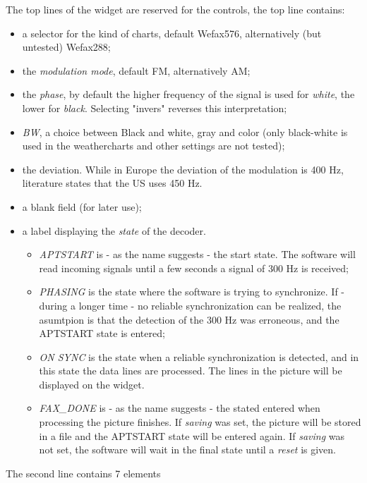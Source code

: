 \documentclass[11pt]{article}
\begin{document}
The top lines of the widget are reserved for the controls,
the top line contains:
\begin{itemize}
\item a selector for the kind of charts, default Wefax576, alternatively
(but untested) Wefax288;
\item the {\em modulation mode}, default FM, alternatively AM;
\item the {\em phase}, by default the higher frequency of the signal
is used for {\em white}, the lower for {\em black}.
Selecting "invers" reverses this interpretation;
\item {\em BW}, a choice between Black and white, gray and color
(only black-white is used in the weathercharts and other settings are not
tested);
\item the {deviation}. While in Europe the deviation of the modulation is
400 Hz, literature states that the US uses 450 Hz.
\item a blank field (for later use);
\item a label displaying the {\em state} of the decoder. 
\begin{itemize}
\item {\em APTSTART} is - as the name suggests - the start state. The software
will read incoming signals until a few seconds a signal of 300 Hz
is received;
\item {\em PHASING} is the state where the software is trying to synchronize.
If - during a longer time - no reliable synchronization can be realized, the
asumtpion is that the detection of the 300 Hz was erroneous, and the APTSTART
state is entered;
\item {\em ON SYNC} is the state when a reliable synchronization is detected,
and in this state the data lines are processed.
The lines in the picture will be displayed on the widget.
\item {\em FAX\_DONE} is - as the name suggests - the stated entered when
processing the picture finishes. If {\em saving} was set, the picture
will be stored in a file and the APTSTART state will be entered again.
If {\em saving} was not set, the software will wait in the final state
until a {\em reset} is given.
\end{itemize}
\end{itemize}
The second line contains 7 elements
\end{document}
